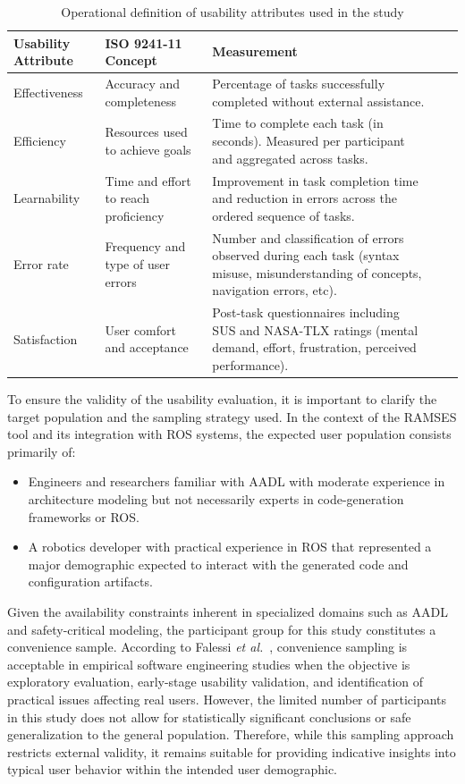 \bgroup
{}
\begin{xltabular}{\textwidth}{X X X X X}
\caption{Operational definition of usability attributes used in the study}
\label{tab:usability_operationalization}\\
\toprule
{}%
	Usability Attribute & ISO 9241-11 Concept & Measurement \\
	\midrule
	Effectiveness & Accuracy and completeness & Percentage of tasks successfully completed without external assistance. \\
	Efficiency & Resources used to achieve goals & 		Time to complete each task (in seconds). Measured per participant and aggregated across tasks. \\
	Learnability & Time and effort to reach proficiency & Improvement in task completion time and reduction in errors across the ordered sequence of tasks. \\
	Error rate & Frequency and type of user errors & 	Number and classification of errors observed during each task (syntax misuse, misunderstanding of concepts, navigation errors, etc). \\ 
	Satisfaction & User comfort and acceptance & 	Post-task questionnaires including \gls{SUS} and NASA-\gls{TLX} ratings (mental demand, effort, frustration, perceived performance). \\ 
\end{xltabular}


To ensure the validity of the usability evaluation, it is important to clarify the target population and the sampling strategy used. In the context of the \gls{RAMSES} tool and its integration with \gls{ROS} systems, the expected user population consists primarily of:

\begin{itemize}
	\item Engineers and researchers familiar with \gls{AADL} with moderate experience in architecture modeling but not necessarily experts in code-generation frameworks or \gls{ROS}.
	\item A robotics developer with practical experience in \gls{ROS} that represented a major demographic expected to interact with the generated code and configuration artifacts.
\end{itemize}

Given the availability constraints inherent in specialized domains such as \gls{AADL} and safety-critical modeling, the participant group for this study constitutes a convenience sample. According to Falessi \textit{et al.}~\cite{Falessi_Juristo_Wohlin_Turhan_Münch_Jedlitschka_Oivo_2017}, convenience sampling is acceptable in empirical software engineering studies when the objective is exploratory evaluation, early-stage usability validation, and identification of practical issues affecting real users. However, the limited number of participants in this study does not allow for statistically significant conclusions or safe generalization to the general population. Therefore, while this sampling approach restricts external validity, it remains suitable for providing indicative insights into typical user behavior within the intended user demographic.

